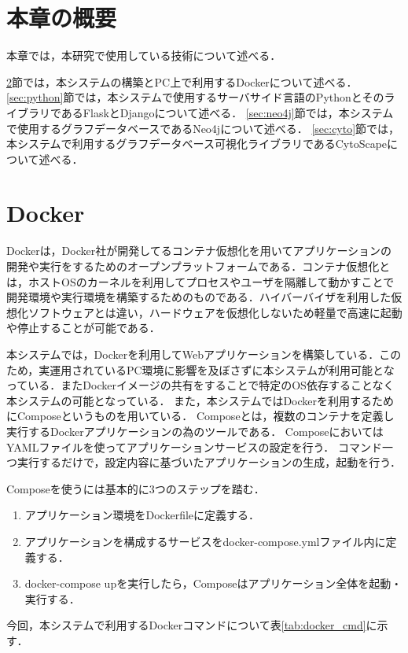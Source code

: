 \section{本章の概要}
本章では，本研究で使用している技術について述べる．

\ref{sec:docker}節では，本システムの構築とPC上で利用するDockerについて述べる．
\ref{sec:python}節では，本システムで使用するサーバサイド言語のPythonとそのライブラリであるFlaskとDjangoについて述べる．
\ref{sec:neo4j}節では，本システムで使用するグラフデータベースであるNeo4jについて述べる．
\ref{sec:cyto}節では，本システムで利用するグラフデータベース可視化ライブラリであるCytoScapeについて述べる．

\section{Docker}\label{sec:docker}
Docker\cite{docker}は，Docker社が開発してるコンテナ仮想化を用いてアプリケーションの開発や実行をするためのオープンプラットフォームである．コンテナ仮想化とは，ホストOSのカーネルを利用してプロセスやユーザを隔離して動かすことで開発環境や実行環境を構築するためのものである．ハイバーバイザを利用した仮想化ソフトウェアとは違い，ハードウェアを仮想化しないため軽量で高速に起動や停止することが可能である．

本システムでは，Dockerを利用してWebアプリケーションを構築している．このため，実運用されているPC環境に影響を及ぼさずに本システムが利用可能となっている．またDockerイメージの共有をすることで特定のOS依存することなく本システムの可能となっている．
また，本システムではDockerを利用するためにComposeというものを用いている．
Composeとは，複数のコンテナを定義し実行するDockerアプリケーションの為のツールである．
ComposeにおいてはYAML\cite{YAML}ファイルを使ってアプリケーションサービスの設定を行う．
コマンド一つ実行するだけで，設定内容に基づいたアプリケーションの生成，起動を行う．

Composeを使うには基本的に3つのステップを踏む．

\begin{enumerate}
    \item アプリケーション環境をDockerfileに定義する．
    \item アプリケーションを構成するサービスをdocker-compose.ymlファイル内に定義する．
    \item docker-compose upを実行したら，Composeはアプリケーション全体を起動・実行する．
\end{enumerate}

今回，本システムで利用するDockerコマンドについて表\ref{tab:docker_cmd}に示す．

